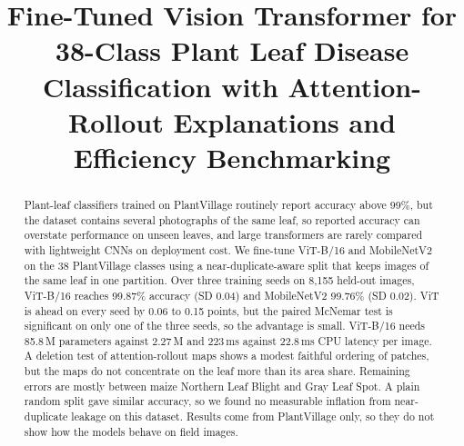 \documentclass[conference]{IEEEtran}
\begin{document}
\title{Fine-Tuned Vision Transformer for 38-Class Plant Leaf Disease Classification with Attention-Rollout Explanations and Efficiency Benchmarking}

\author{
\and
{}
\and
{}
\and
{}
}

\maketitle

\begin{abstract}
Plant-leaf classifiers trained on PlantVillage routinely report accuracy above 99\%, but the dataset contains several photographs of the same leaf, so reported accuracy can overstate performance on unseen leaves, and large transformers are rarely compared with lightweight CNNs on deployment cost. We fine-tune ViT-B/16 and MobileNetV2 on the 38 PlantVillage classes using a near-duplicate-aware split that keeps images of the same leaf in one partition. Over three training seeds on 8,155 held-out images, ViT-B/16 reaches 99.87\% accuracy (SD 0.04) and MobileNetV2 99.76\% (SD 0.02). ViT is ahead on every seed by 0.06 to 0.15 points, but the paired McNemar test is significant on only one of the three seeds, so the advantage is small. ViT-B/16 needs 85.8\,M parameters against 2.27\,M and 223\,ms against 22.8\,ms CPU latency per image. A deletion test of attention-rollout maps shows a modest faithful ordering of patches, but the maps do not concentrate on the leaf more than its area share. Remaining errors are mostly between maize Northern Leaf Blight and Gray Leaf Spot. A plain random split gave similar accuracy, so we found no measurable inflation from near-duplicate leakage on this dataset. Results come from PlantVillage only, so they do not show how the models behave on field images.
\end{abstract}
\end{document}

